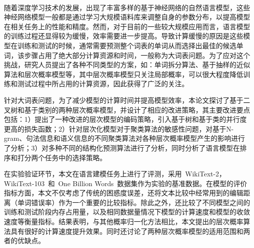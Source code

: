 \documentclass[master,openright,oneside,color]{buaathesis}
\begin{document}


\maketitle
\pagestyle{frontmatter}
\begin{cabstract}
~\

随着深度学习技术的发展，出现了丰富多样的基于神经网络的自然语言模型，这些神经网络模型一般都是通过学习大规模语料库来调整自身的参数分布，以提高模型在相关任务上的性能和精度。然而，对于目前的一些较大规模应用而言，语言模型的训练过程还显得较为缓慢，效率需要进一步提高。导致计算缓慢的原因是这些模型在训练和测试的时候，通常需要预测整个词表的单词从而选择出最佳的候选单词，该步骤占用了绝大部分计算资源和时间，一般称为大词表问题。为了应对这个挑战，研究人员提出了各种不同类型的方案，如：单词拆分算法、基于抽样的近似算法和层次概率模型等，其中层次概率模型只关注局部概率，可以很大程度降低训练和测试过程中所占用的计算资源，因此获得了广泛的关注。

针对大词表问题，为了减少模型的计算时间并提高模型效率，本论文探讨了基于二叉树和基于类别的两种层次概率模型，并设计了相应的改进策略，其主要改进要点包括：1）提出了一种改进的层次模型的编码策略，引入基于树和基于类的并行度更高的损失函数；2）针对层次化模型对于聚类算法的敏感性问题，对基于N-gram、句法信息和语义信息的不同聚类算法对各种层次概率模型产生的影响进行了分析；3）对多种不同的结构化预测算法进行了分析，同时分析了语言模型在排序和打分两个任务中的选择策略。

在实验验证环节，本文在语言建模任务上进行了评测，采用~WikiText-2， WikiText-103~和~One Billion Words~数据集作为实验的基准数据。在模型的评价指标方面，本文不仅考虑了传统的困惑度误差，还将文本比较中经常用到的编辑距离（单词错误率）作为一个重要的比较指标。除此之外，还比较了不同模型之间的训练和测试阶段内存占用量，以及相同数据量情况下模型的计算速度和模型的收敛速度等衡量指标。结果表明，与其他概率归一化方法相比，本文提出的层次概率算法具有很好的计算速度提升效果。同时还讨论了两种层次概率模型的适用范围和两者的优缺点。
\end{cabstract}
\end{document}
